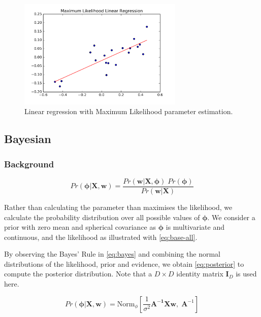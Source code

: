 \documentclass[11pt,openright,a4paper]{article}
\numberwithin{equation}{section}
\begin{document}
\begin{figure}[H]
  \centering
  \includegraphics[width=0.7\textwidth]{lin-ml}
    \caption{Linear regression with Maximum Likelihood parameter estimation.}
  \label{fig:lin-ml}
\end{figure}

\subsection{Bayesian} \label{ssec:approaches-bayesian}

\subsubsection{Background}
\begin{equation} \label{eq:bayes}
    Pr \left ( \boldsymbol\phi | \mathbf{X}, \mathbf{w} \right ) =
        \frac{Pr \left (\mathbf{w} | \mathbf{X}, \boldsymbol\phi \right ) \; Pr \left ( \boldsymbol\phi  \right )}
             {Pr \left ( \mathbf{w} | \mathbf{X} \right )}
\end{equation}

Rather than calculating the parameter than maximises the likelihood, we calculate the probability distribution over all possible values of $\boldsymbol\phi$. We consider a prior with zero mean and spherical covariance as $\boldsymbol\phi$ is multivariate and continuous, and the likelihood as illustrated with \autoref{eq:base-all}.

By observing the Bayes' Rule in \autoref{eq:bayes} and combining the normal distributions of the likelihood, prior and evidence, we obtain \autoref{eq:posterior} to compute the posterior distribution. Note that a $D \times D$ identity matrix $\mathbf{I}_D$ is used here.

\begin{equation} \label{eq:posterior}
    Pr \left ( \boldsymbol\phi | \mathbf{X}, \mathbf{w} \right ) =
        \text{Norm}_{\phi} 
            \left [ \frac{1}{\sigma^2} \mathbf{A^{-1} X w} , \; \mathbf{A}^{-1} \right ]
\end{equation}
\end{document}
